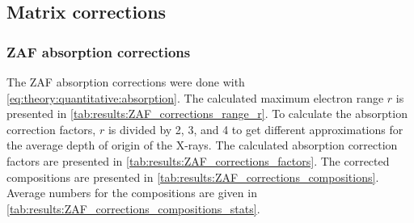













\subsection{Matrix corrections}
\label{results:matrix_corrections}



\subsubsection{ZAF absorption corrections}
\label{results:matrix_corrections:ZAF}

The ZAF absorption corrections were done with \cref{eq:theory:quantitative:absorption}. %
The calculated maximum electron range $r$ is presented in \cref{tab:results:ZAF_corrections_range_r}.
To calculate the absorption correction factors, $r$ is divided by 2, 3, and 4 to get different approximations for the average depth of origin of the X-rays.
The calculated absorption correction factors are presented in \cref{tab:results:ZAF_corrections_factors}.
The corrected compositions are presented in \cref{tab:results:ZAF_corrections_compositions}.
Average numbers for the compositions are given in \cref{tab:results:ZAF_corrections_compositions_stats}.




